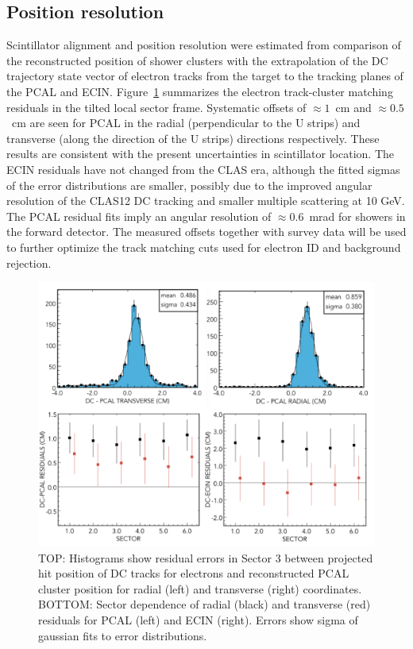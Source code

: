 \subsection{Position resolution}
Scintillator alignment and position resolution were estimated from comparison of the reconstructed position of shower clusters with the extrapolation of the DC trajectory state vector of electron tracks from the target to the tracking planes of the PCAL and ECIN.  
Figure~\ref{fig:S10_1_3} summarizes the electron track-cluster matching residuals in the tilted local sector frame.   Systematic offsets of $\approx 1$~cm and $\approx 0.5$ ~cm are seen for PCAL in the radial (perpendicular to the U strips) and transverse (along the direction of the U strips) directions respectively.  These results are consistent with the present uncertainties in scintillator location. The ECIN residuals have not changed from the CLAS era, although the fitted sigmas of the error distributions are smaller, possibly due to the improved angular resolution of the CLAS12 DC tracking and smaller multiple scattering at 10 GeV.  The PCAL residual fits imply an angular resolution of $\approx 0.6$~mrad for showers in the forward detector.  The measured offsets together with survey data will be used to further optimize the track matching cuts used for electron ID and background rejection. 

\begin{figure}[hbt]
\centering
\includegraphics[width=1.0\columnwidth,keepaspectratio]{img/S10_1_3.png}
\caption[]{TOP: Histograms show residual errors in Sector 3 between projected hit position of DC tracks for electrons and reconstructed PCAL cluster position for radial (left) and transverse (right) coordinates. BOTTOM: Sector dependence of radial (black) and transverse (red) residuals for PCAL (left) and ECIN (right).  Errors show sigma of gaussian fits to error distributions.}
\label{fig:S10_1_3}
\end{figure}

